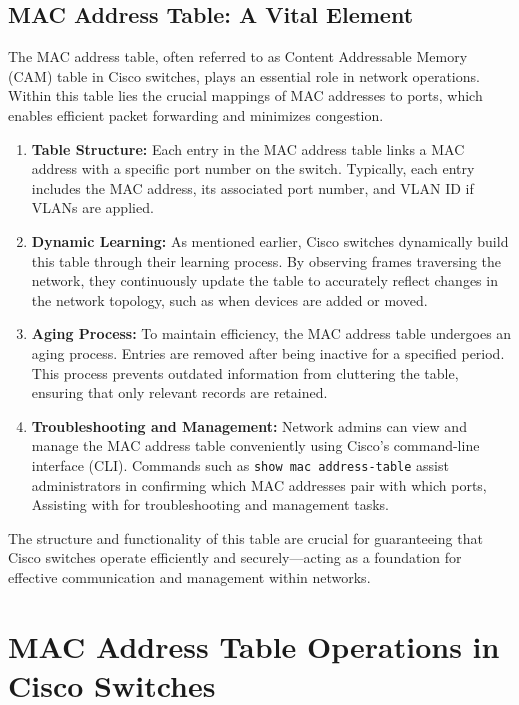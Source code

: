 \documentclass[11pt,a4paper]{article}
\begin{document}
\subsection*{MAC Address Table: A Vital Element}

The MAC address table, often referred to as Content Addressable Memory (CAM) table in Cisco switches, plays an essential role in network operations. Within this table lies the crucial mappings of MAC addresses to ports, which enables efficient packet forwarding and minimizes congestion.

\begin{enumerate}
    \item \textbf{Table Structure:} Each entry in the MAC address table links a MAC address with a specific port number on the switch. Typically, each entry includes the MAC address, its associated port number, and VLAN ID if VLANs are applied.

    \item \textbf{Dynamic Learning:} As mentioned earlier, Cisco switches dynamically build this table through their learning process. By observing frames traversing the network, they continuously update the table to accurately reflect changes in the network topology, such as when devices are added or moved.

    \item \textbf{Aging Process:} To maintain efficiency, the MAC address table undergoes an aging process. Entries are removed after being inactive for a specified period. This process prevents outdated information from cluttering the table, ensuring that only relevant records are retained.

    \item \textbf{Troubleshooting and Management:} Network admins can view and manage the MAC address table conveniently using Cisco's command-line interface (CLI). Commands such as \lstinline{show mac address-table} assist administrators in confirming which MAC addresses pair with which ports, Assisting with for troubleshooting and management tasks.

\end{enumerate}

The structure and functionality of this table are crucial for guaranteeing that Cisco switches operate efficiently and securely—acting as a foundation for effective communication and management within networks.



\section*{MAC Address Table Operations in Cisco Switches}
\end{document}
